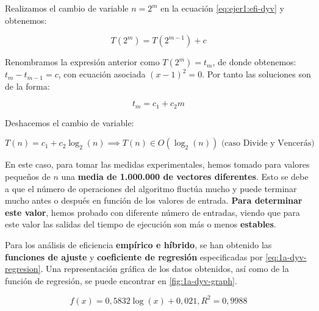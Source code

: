 Realizamos el cambio de variable $n = 2^{m}$ en la ecuación \ref{eq:ejer1:efi-dyv} y obtenemos:

\begin{equation*}
    T(2^{m}) =  T(2^{m-1}) + c 
\end{equation*}

Renombramos la expresión anterior como $T(2^{m}) = t_{m}$, de donde obtenemos: $t_{m} - t_{m-1} = c$, con
ecuación asociada $(x-1)^{2} = 0$. Por tanto las soluciones son de la forma: 

\begin{equation*}
    t_{m} = c_{1} + c_{2}m
\end{equation*}

Deshacemos el cambio de variable:

\begin{equation}
    T(n) = c_{1} + c_{2} \log_2(n) \implies \boxed{T(n) \in O(\log_2(n))}
    \text{ (caso Divide y Vencerás)}
    \label{eq:1a-eficiencia-lineal}
\end{equation}

En este caso, para tomar las medidas experimentales, hemos tomado para valores pequeños de $n$ una 
\textbf{media de 1.000.000 de vectores diferentes}. Esto se debe a que el número de operaciones del 
algoritmo fluctúa mucho y puede terminar mucho antes o después en función
de los valores de entrada. \textbf{Para determinar este valor}, hemos probado con diferente número de entradas, 
viendo que para este valor las salidas del tiempo de ejecución son más o menos \textbf{estables}. 

Para los análisis de eficiencia \textbf{empírico e híbrido}, se han obtenido las \textbf{funciones de ajuste}
y \textbf{coeficiente de regresión} especificadas por \ref{eq:1a-dyv-regresion}. Una representación
gráfica de los datos obtenidos, así como de la función de regresión, se puede encontrar en \ref{fig:1a-dyv-graph}.

\begin{equation}
    \boxed{f(x) = 0,5832 \log(x) + 0,021, R^2 = 0,9988}
    \label{eq:1a-dyv-regresion}
\end{equation}

